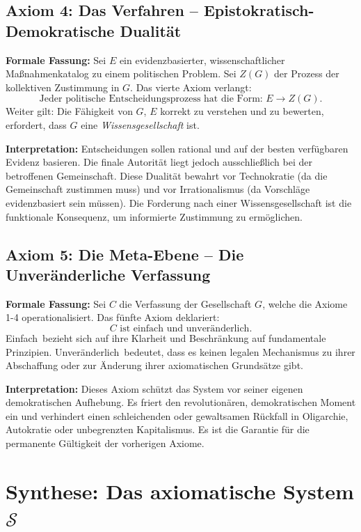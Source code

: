 \subsection{Axiom 4: Das Verfahren -- Epistokratisch-Demokratische Dualität}
\label{ax:4}

\textbf{Formale Fassung:}
Sei $E$ ein evidenzbasierter, wissenschaftlicher Maßnahmenkatalog zu einem politischen Problem. Sei $Z(G)$ der Prozess der kollektiven Zustimmung in $G$. Das vierte Axiom verlangt:
\[
\boxed{\text{Jeder politische Entscheidungsprozess hat die Form: } E \longrightarrow Z(G).}
\]
Weiter gilt: Die Fähigkeit von $G$, $E$ korrekt zu verstehen und zu bewerten, erfordert, dass $G$ eine \emph{Wissensgesellschaft} ist.

\textbf{Interpretation:}
Entscheidungen sollen rational und auf der besten verfügbaren Evidenz basieren. Die finale Autorität liegt jedoch ausschließlich bei der betroffenen Gemeinschaft. Diese Dualität bewahrt vor Technokratie (da die Gemeinschaft zustimmen muss) und vor Irrationalismus (da Vorschläge evidenzbasiert sein müssen). Die Forderung nach einer Wissensgesellschaft ist die funktionale Konsequenz, um informierte Zustimmung zu ermöglichen.

\subsection{Axiom 5: Die Meta-Ebene -- Die Unveränderliche Verfassung}
\label{ax:5}

\textbf{Formale Fassung:}
Sei $C$ die Verfassung der Gesellschaft $G$, welche die Axiome 1-4 operationalisiert. Das fünfte Axiom deklariert:
\[
\boxed{C \text{ ist einfach und unveränderlich.}}
\]
\glqq Einfach\grqq\ bezieht sich auf ihre Klarheit und Beschränkung auf fundamentale Prinzipien. \glqq Unveränderlich\grqq\ bedeutet, dass es keinen legalen Mechanismus zu ihrer Abschaffung oder zur Änderung ihrer axiomatischen Grundsätze gibt.

\textbf{Interpretation:}
Dieses Axiom schützt das System vor seiner eigenen demokratischen Aufhebung. Es friert den revolutionären, demokratischen Moment ein und verhindert einen schleichenden oder gewaltsamen Rückfall in Oligarchie, Autokratie oder unbegrenzten Kapitalismus. Es ist die Garantie für die permanente Gültigkeit der vorherigen Axiome.

\section{Synthese: Das axiomatische System $\mathcal{S}$}
\label{sec:synthese}

